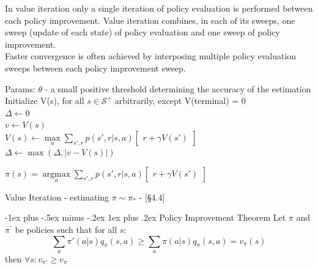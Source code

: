 \documentclass[10pt,landscape]{article}
\makeatletter
\renewcommand{\subsection}{\@startsection{subsection}{2}{0mm}%
                                {-1explus -.5ex minus -.2ex}%
                                {0.5ex plus .2ex}%
                                {\normalfont\normalsize\bfseries}}
\renewcommand{\subsubsection}{\@startsection{subsubsection}{3}{0mm}%
                                {-1ex plus -.5ex minus -.2ex}%
                                {1ex plus .2ex}%
                                {\normalfont\small\bfseries}}
\DeclareMathOperator*{\argmax}{argmax}
\makeatother
\begin{document}
\begin{multicols}{3}
In value iteration only a single iteration of policy evaluation is performed between each policy improvement. 
Value iteration combines, in each of its sweeps, one sweep (update of each state) of policy evaluation and one sweep of policy improvement.\\ Faster convergence is often achieved by interposing multiple policy evaluation sweeps between each policy improvement sweep.

\begin{algorithm}[H]
Params: $\theta$ - a small positive threshold determining the accuracy of the estimation \\
Initialize V(s), for all $s \in \mathcal{S}^{+}$ arbitrarily, except V(terminal) = 0\\
 $\Delta \leftarrow 0$ \\
\While{$\Delta \ge \theta$}
{
   {
        $v \leftarrow V(s)$\\
        $V(s) \leftarrow \max\limits_a \sum\limits_{s', r} p(s',r | s, a) \begin{bmatrix}
                r + \gamma V(s')
        \end{bmatrix}$ \\
        $\Delta \leftarrow \max(\Delta, | v - V(s)|)$
        }
}

 $\pi(s) = \argmax\limits_a \sum\limits_{s', r} p(s',r | s, a) \begin{bmatrix}
     r + \gamma V(s')
  \end{bmatrix}$
\caption{Value Iteration - estimating  $\pi \sim \pi_*$ - [§4.4]}
\end{algorithm}


\subsubsection{Policy Improvement Theorem}
Let $\pi$ and $\pi^{'}$ be policies such that for all $s$: $$\sum_a \pi'(a|s) q_\pi(s,a) \geq \sum_a \pi(a|s)q_\pi(s,a) = v_\pi(s)$$ then $\forall s: v_{\pi'} \geq v_\pi$



\end{multicols}
\end{document}
